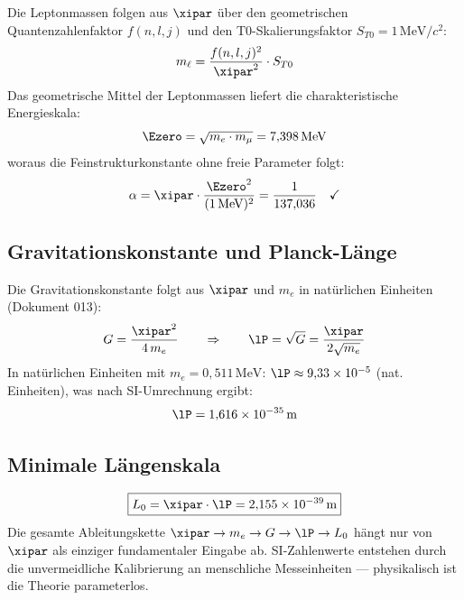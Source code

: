 Die Leptonmassen folgen aus $\xipar$ über den geometrischen Quantenzahlenfaktor $f(n,l,j)$ und den T0-Skalierungsfaktor $S_{T0} = 1\,\text{MeV}/c^2$:
\begin{equation}
	m_\ell = \frac{f(n,l,j)^2}{\xipar^2} \cdot S_{T0}
\end{equation}
Das geometrische Mittel der Leptonmassen liefert die charakteristische Energieskala:
\begin{equation}
	\Ezero = \sqrt{m_e \cdot m_\mu} = 7{,}398\,\text{MeV}
\end{equation}
woraus die Feinstrukturkonstante ohne freie Parameter folgt:
\begin{equation}
	\alpha = \xipar \cdot \frac{\Ezero^2}{(1\,\text{MeV})^2} = \frac{1}{137{,}036} \quad \checkmark
\end{equation}

\subsection{Gravitationskonstante und Planck-Länge}

Die Gravitationskonstante folgt aus $\xipar$ und $m_e$ in natürlichen Einheiten (Dokument 013):
\begin{equation}
	G = \frac{\xipar^2}{4\,m_e} \qquad\Rightarrow\qquad \lP = \sqrt{G} = \frac{\xipar}{2\sqrt{m_e}}
\end{equation}
In natürlichen Einheiten mit $m_e = 0{,}511\,\text{MeV}$: $\lP \approx 9{,}33 \times 10^{-5}$ (nat. Einheiten), was nach SI-Umrechnung ergibt:
\begin{equation}
	\lP = 1{,}616 \times 10^{-35}\,\text{m}
\end{equation}

\subsection{Minimale Längenskala}

\begin{keyresult}
\begin{equation}
	\boxed{L_0 = \xipar \cdot \lP = 2{,}155 \times 10^{-39}\,\text{m}}
\end{equation}
Die gesamte Ableitungskette $\xipar \to m_e \to G \to \lP \to L_0$ hängt nur von $\xipar$ als einziger fundamentaler Eingabe ab. SI-Zahlenwerte entstehen durch die unvermeidliche Kalibrierung an menschliche Messeinheiten — physikalisch ist die Theorie parameterlos.
\end{keyresult}

